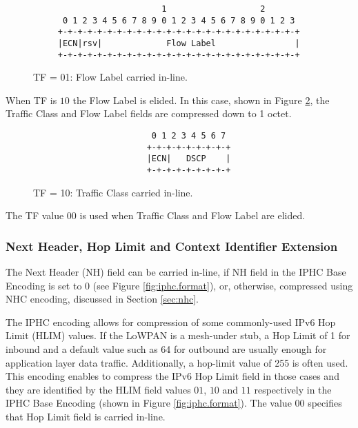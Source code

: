 \documentclass[12pt, titlepage, a4paper]{report}
\newenvironment{mylisting}
{\begin{list}{}{\setlength{\leftmargin}{1em}}\item\footnotesize}
{\end{list}}
\begin{document}
\begin{figure}[htp]
\begin{mylisting}
\begin{verbatim}
                          1                   2
      0 1 2 3 4 5 6 7 8 9 0 1 2 3 4 5 6 7 8 9 0 1 2 3
     +-+-+-+-+-+-+-+-+-+-+-+-+-+-+-+-+-+-+-+-+-+-+-+-+
     |ECN|rsv|             Flow Label                |
     +-+-+-+-+-+-+-+-+-+-+-+-+-+-+-+-+-+-+-+-+-+-+-+-+
\end{verbatim}
\end{mylisting}
\caption{TF = 01: Flow Label carried in-line.}\label{fig:tf.01}
\end{figure}

When TF is $10$ the Flow Label is elided. In this case, shown in Figure \ref{fig:tf.10}, the Traffic Class and Flow Label fields are compressed down to 1 octet.

\begin{figure}[htp]
\begin{mylisting}
\begin{verbatim}
                        0 1 2 3 4 5 6 7
                       +-+-+-+-+-+-+-+-+
                       |ECN|   DSCP    |
                       +-+-+-+-+-+-+-+-+
\end{verbatim}
\end{mylisting}
\caption{TF = 10: Traffic Class carried in-line.}\label{fig:tf.10}
\end{figure}

The TF value $00$ is used when Traffic Class and Flow Label are elided.

\subsubsection{Next Header, Hop Limit and Context Identifier Extension}
The Next Header (NH) field can be carried in-line, if NH field in the IPHC Base Encoding is set to $0$ (see Figure \ref{fig:iphc.format}), or, otherwise, compressed using NHC encoding, discussed in Section \ref{sec:nhc}.

The IPHC encoding allows for compression of some commonly-used IPv6 Hop Limit (HLIM) values.  If the LoWPAN is a mesh-under stub, a Hop Limit of 1 for inbound and a default value such as 64 for outbound are usually enough for application layer data traffic.  Additionally, a hop-limit value of 255 is often used.  This encoding enables to compress the IPv6 Hop Limit field in those cases and they are identified by the HLIM field values $01$, $10$ and $11$ respectively in the IPHC Base Encoding (shown in Figure \ref{fig:iphc.format}). The value $00$ specifies that Hop Limit field is carried in-line.
\end{document}
